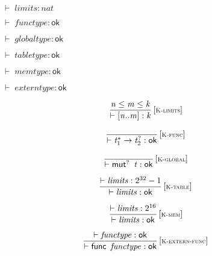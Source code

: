 \vspace{1ex}

$\boxed{{ \vdash }\;{\mathit{limits}} : {\mathit{nat}}}$

$\boxed{{ \vdash }\;{\mathit{functype}} : \mathsf{ok}}$

$\boxed{{ \vdash }\;{\mathit{globaltype}} : \mathsf{ok}}$

$\boxed{{ \vdash }\;{\mathit{tabletype}} : \mathsf{ok}}$

$\boxed{{ \vdash }\;{\mathit{memtype}} : \mathsf{ok}}$

$\boxed{{ \vdash }\;{\mathit{externtype}} : \mathsf{ok}}$

\vspace{1ex}

$$
\begin{array}{@{}c@{}}\displaystyle
\frac{
{\mathit{n}} \leq {\mathit{m}} \leq {\mathit{k}}
}{
{ \vdash }\;{}[{\mathit{n}} .. {\mathit{m}}] : {\mathit{k}}
} \, {[\textsc{\scriptsize K{-}limits}]}
\qquad
\end{array}
$$

$$
\begin{array}{@{}c@{}}\displaystyle
\frac{
}{
{ \vdash }\;{{\mathit{t}}_{{1}}^\ast} \rightarrow {{\mathit{t}}_{{2}}^?} : \mathsf{ok}
} \, {[\textsc{\scriptsize K{-}func}]}
\qquad
\end{array}
$$

$$
\begin{array}{@{}c@{}}\displaystyle
\frac{
}{
{ \vdash }\;{\mathsf{mut}^?}~\,{\mathit{t}} : \mathsf{ok}
} \, {[\textsc{\scriptsize K{-}global}]}
\qquad
\end{array}
$$

$$
\begin{array}{@{}c@{}}\displaystyle
\frac{
{ \vdash }\;{\mathit{limits}} : {2^{32}} - 1
}{
{ \vdash }\;{\mathit{limits}} : \mathsf{ok}
} \, {[\textsc{\scriptsize K{-}table}]}
\qquad
\end{array}
$$

$$
\begin{array}{@{}c@{}}\displaystyle
\frac{
{ \vdash }\;{\mathit{limits}} : {2^{16}}
}{
{ \vdash }\;{\mathit{limits}} : \mathsf{ok}
} \, {[\textsc{\scriptsize K{-}mem}]}
\qquad
\end{array}
$$

\vspace{1ex}

$$
\begin{array}{@{}c@{}}\displaystyle
\frac{
{ \vdash }\;{\mathit{functype}} : \mathsf{ok}
}{
{ \vdash }\;\mathsf{func}~\,{\mathit{functype}} : \mathsf{ok}
} \, {[\textsc{\scriptsize K{-}extern{-}func}]}
\qquad
\end{array}
$$

